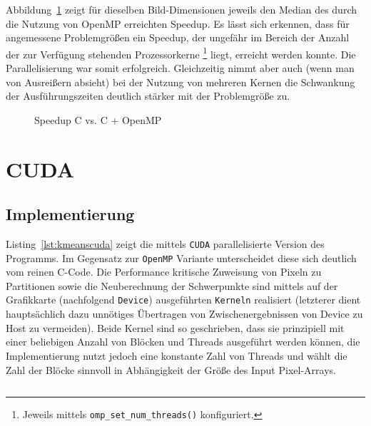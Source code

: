 \documentclass[
    bibliography=totoc, cd=lightcolor, cdmath=false, ngerman]{tudscrreprt}
\begin{document}
Abbildung~\ref{img:copenmpspeedup} zeigt für dieselben Bild-Dimensionen jeweils
den Median des durch die Nutzung von OpenMP erreichten Speedup. Es lässt sich
erkennen, dass für angemessene Problemgrößen ein Speedup, der ungefähr im
Bereich der Anzahl der zur Verfügung stehenden Prozessorkerne \footnote{Jeweils
mittels \texttt{omp\_set\_num\_threads()} konfiguriert.} liegt, erreicht werden
konnte. Die Parallelisierung war somit erfolgreich. Gleichzeitig nimmt aber
auch (wenn man von Ausreißern absieht) bei der Nutzung von mehreren Kernen die
Schwankung der Ausführungszeiten deutlich stärker mit der Problemgröße zu.

%    

\begin{figure}[htbp]
  \centering
    
  \caption{Speedup C vs. C + OpenMP}
  \label{img:copenmpspeedup}
\end{figure}

\section{CUDA}

\subsection{Implementierung}

Listing~\ref{lst:kmeanscuda} zeigt die mittels \texttt{CUDA} parallelisierte
Version des Programms. Im Gegensatz zur \texttt{OpenMP} Variante unterscheidet
diese sich deutlich vom reinen C-Code. Die Performance kritische Zuweisung von
Pixeln zu Partitionen sowie die Neuberechnung der Schwerpunkte sind mittels auf
der Grafikkarte (nachfolgend \texttt{Device}) ausgeführten \texttt{Kerneln}
realisiert (letzterer dient hauptsächlich dazu unnötiges Übertragen von
Zwischenergebnissen von Device zu Host zu vermeiden). Beide Kernel sind so
geschrieben, dass sie prinzipiell mit einer beliebigen Anzahl von Blöcken und
Threads ausgeführt werden können, die Implementierung nutzt jedoch eine
konstante Zahl von Threads und wählt die Zahl der Blöcke sinnvoll in
Abhängigkeit der Größe des Input Pixel-Arrays.

\inputminted[label=kmeanscuda]{CUDA}{c/src/kmeans.cu}
\end{document}
